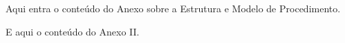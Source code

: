 \label{anexo-estrutura-modelo-procedimento}
Aqui entra o conteúdo do Anexo sobre a Estrutura e Modelo de Procedimento.

\pagebreak

\label{anexo-regras-versionamento}

E aqui o conteúdo do Anexo II.
